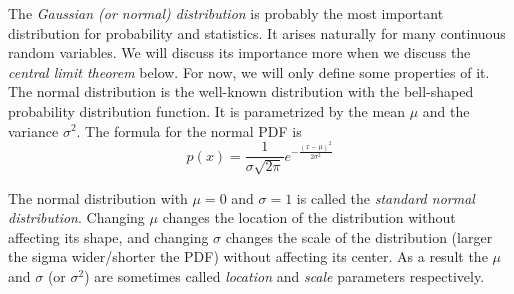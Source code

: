 \begin{marginfigure}
  \caption{\label{fig:normal-pdf}%
    Normal PDF, with $\mu = 0$ and $\sigma = 1$.
  }
\end{marginfigure}
The \emph{Gaussian (or normal) distribution} is probably the most important
distribution for probability and statistics.
It arises naturally for many continuous random variables.
We will discuss its importance more when we discuss
the \emph{central limit theorem} below.
For now, we will only define some properties of it.
The normal distribution is the well-known distribution with the 
bell-shaped probability distribution function.
It is parametrized by the mean $\mu$ and the variance $\sigma^{2}$.
The formula for the normal PDF is
\[
  p(x) = \frac{1}{\sigma\sqrt{2\pi}}
        e^{-\frac{(x - \mu)^{2}}{2\sigma^{2}}}
\]

The normal distribution with $\mu = 0$ and $\sigma = 1$ is called
the \emph{standard normal distribution}.
Changing $\mu$ changes the location of the distribution
without affecting its shape,
and changing $\sigma$ changes the scale of the distribution
(larger the sigma wider/shorter the PDF)
without affecting its center.
As a result the $\mu$ and $\sigma$ (or $\sigma^{2}$) are
sometimes called \emph{location} and \emph{scale} parameters respectively.

